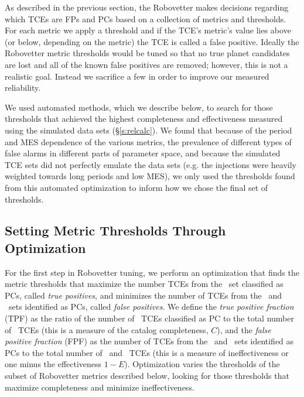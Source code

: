 \label{s:optimize}
As described in the previous section, the Robovetter makes decisions regarding which TCEs are FPs and PCs based on a collection of metrics and thresholds.  For each metric we apply a threshold and if the TCE's metric's value lies above (or below, depending on the metric) the TCE is called a false positive.  Ideally the Robovetter metric thresholds would be tuned so that no true planet candidates are lost and all of the known false positives are removed; however, this is not a realistic goal.  Instead we sacrifice a few  in order to improve our measured reliability. 

We used automated methods, which we describe below, to search for those thresholds that achieved the highest completeness and effectiveness measured using the simulated data sets (\S\ref{s:relcalc}). We found that because of the period and MES dependence of the various metrics, the prevalence of different types of false alarms in different parts of parameter space, and because the simulated TCE sets did not perfectly emulate the data sets (e.g. the injections were heavily weighted towards long periods and low MES), we only used the thresholds found from this automated optimization to inform how we chose the final set of thresholds.



\subsection{Setting Metric Thresholds Through Optimization}
\label{s:full_optimize}
For the first step in Robovetter tuning, we perform an optimization that finds the metric thresholds that maximize the number TCEs from the \injtce\ set classified as PCs, called {\it true positives}, and minimizes the number of TCEs from the \scrtce\ and \invtce\ sets identified as PCs, called {\it false positives}.  We define the {\it true positive fraction} (TPF) as the ratio of the number of \injtce\ TCEs classified as PC to the total number of \injtce\ TCEs (this is a measure of the catalog completeness, $C$), and the {\it false positive fraction} (FPF) as the number of TCEs from the \scrtce\ and \invtce\ sets identified as PCs to the total number of \scrtce\ and \invtce\ TCEs (this is a measure of ineffectiveness or one minus the effectiveness $1-E$).  Optimization varies the thresholds of the subset of Robovetter metrics described below, looking for those thresholds that maximize completeness and minimize ineffectiveness.

